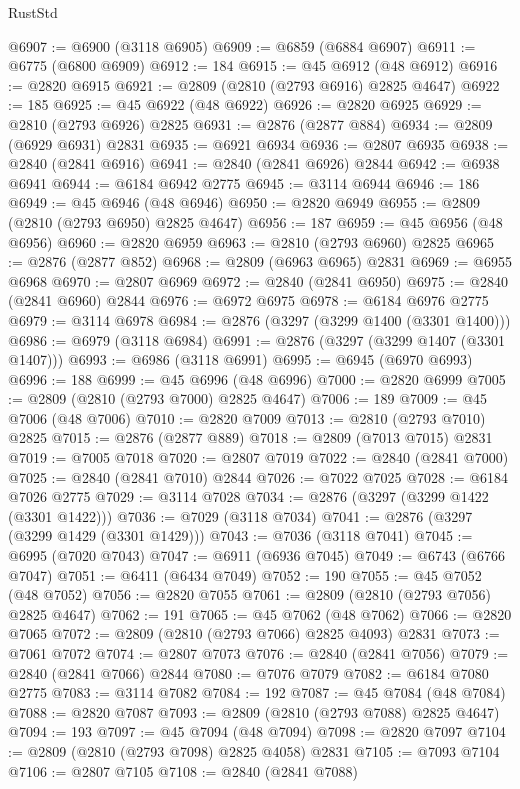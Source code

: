 \begin{lexlean}{RustStd}
\begin{coremodule}
{\begin{coremodule}
{{{{{{{{{{{{{{{{{{{{{{{{{{{{{{{{{@6907 := @6900 (@3118 @6905)
@6909 := @6859 (@6884 @6907)
@6911 := @6775 (@6800 @6909)
@6912 := 184
@6915 := @45 @6912 (@48 @6912)
@6916 := @2820 @6915
@6921 := @2809 (@2810 (@2793 @6916) @2825 @4647)
@6922 := 185
@6925 := @45 @6922 (@48 @6922)
@6926 := @2820 @6925
@6929 := @2810 (@2793 @6926) @2825
@6931 := @2876 (@2877 @884)
@6934 := @2809 (@6929 @6931) @2831
@6935 := @6921 @6934
@6936 := @2807 @6935
@6938 := @2840 (@2841 @6916)
@6941 := @2840 (@2841 @6926) @2844
@6942 := @6938 @6941
@6944 := @6184 @6942 @2775
@6945 := @3114 @6944
@6946 := 186
@6949 := @45 @6946 (@48 @6946)
@6950 := @2820 @6949
@6955 := @2809 (@2810 (@2793 @6950) @2825 @4647)
@6956 := 187
@6959 := @45 @6956 (@48 @6956)
@6960 := @2820 @6959
@6963 := @2810 (@2793 @6960) @2825
@6965 := @2876 (@2877 @852)
@6968 := @2809 (@6963 @6965) @2831
@6969 := @6955 @6968
@6970 := @2807 @6969
@6972 := @2840 (@2841 @6950)
@6975 := @2840 (@2841 @6960) @2844
@6976 := @6972 @6975
@6978 := @6184 @6976 @2775
@6979 := @3114 @6978
@6984 := @2876 (@3297 (@3299 @1400 (@3301 @1400)))
@6986 := @6979 (@3118 @6984)
@6991 := @2876 (@3297 (@3299 @1407 (@3301 @1407)))
@6993 := @6986 (@3118 @6991)
@6995 := @6945 (@6970 @6993)
@6996 := 188
@6999 := @45 @6996 (@48 @6996)
@7000 := @2820 @6999
@7005 := @2809 (@2810 (@2793 @7000) @2825 @4647)
@7006 := 189
@7009 := @45 @7006 (@48 @7006)
@7010 := @2820 @7009
@7013 := @2810 (@2793 @7010) @2825
@7015 := @2876 (@2877 @889)
@7018 := @2809 (@7013 @7015) @2831
@7019 := @7005 @7018
@7020 := @2807 @7019
@7022 := @2840 (@2841 @7000)
@7025 := @2840 (@2841 @7010) @2844
@7026 := @7022 @7025
@7028 := @6184 @7026 @2775
@7029 := @3114 @7028
@7034 := @2876 (@3297 (@3299 @1422 (@3301 @1422)))
@7036 := @7029 (@3118 @7034)
@7041 := @2876 (@3297 (@3299 @1429 (@3301 @1429)))
@7043 := @7036 (@3118 @7041)
@7045 := @6995 (@7020 @7043)
@7047 := @6911 (@6936 @7045)
@7049 := @6743 (@6766 @7047)
@7051 := @6411 (@6434 @7049)
@7052 := 190
@7055 := @45 @7052 (@48 @7052)
@7056 := @2820 @7055
@7061 := @2809 (@2810 (@2793 @7056) @2825 @4647)
@7062 := 191
@7065 := @45 @7062 (@48 @7062)
@7066 := @2820 @7065
@7072 := @2809 (@2810 (@2793 @7066) @2825 @4093) @2831
@7073 := @7061 @7072
@7074 := @2807 @7073
@7076 := @2840 (@2841 @7056)
@7079 := @2840 (@2841 @7066) @2844
@7080 := @7076 @7079
@7082 := @6184 @7080 @2775
@7083 := @3114 @7082
@7084 := 192
@7087 := @45 @7084 (@48 @7084)
@7088 := @2820 @7087
@7093 := @2809 (@2810 (@2793 @7088) @2825 @4647)
@7094 := 193
@7097 := @45 @7094 (@48 @7094)
@7098 := @2820 @7097
@7104 := @2809 (@2810 (@2793 @7098) @2825 @4058) @2831
@7105 := @7093 @7104
@7106 := @2807 @7105
@7108 := @2840 (@2841 @7088)
}}}}}}}}}}}}}}}}}}}}}}}}}}}}}}}}}
\end{coremodule}}
\end{coremodule}
\end{lexlean}

